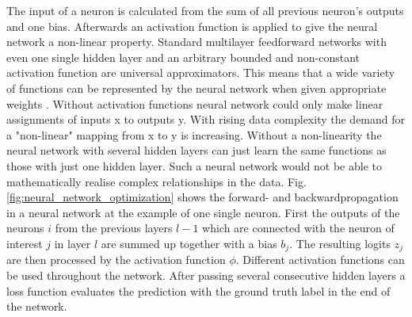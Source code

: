 The input of a neuron is calculated from the sum of all previous neuron's outputs and one bias. Afterwards an activation function is applied to give the neural network a non-linear property. Standard multilayer feedforward networks with even one single hidden layer and an arbitrary bounded and non-constant activation function are universal approximators. This means that a wide variety of functions can be represented by the neural network when given appropriate weights \cite{HORNIK1991}. Without activation functions neural network could only make linear assignments of inputs x to outputs y. With rising data complexity the demand for a "non-linear" mapping from x to y is increasing. Without a non-linearity the neural network with several hidden layers can just learn the same functions as those with just one hidden layer. Such a neural network would not be able to mathematically realise complex relationships in the data. Fig. \ref{fig:neural_network_optimization} shows the forward- and backwardpropagation in a neural network at the example of one single neuron. First the outputs of the neurons $i$ from the previous layers $l-1$ which are connected with the neuron of interest $j$ in layer $l$ are summed up together with a bias $b_{j}$. The resulting logits $z_{j}$ are then processed by the activation function $\phi$. Different activation functions can be used throughout the network. After passing several consecutive hidden layers a loss function evaluates the prediction with the ground truth label in the end of the network.

